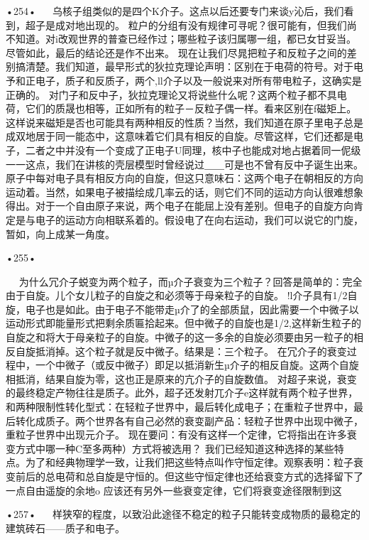 •254•
  
乌核子组类似的是四个K介子。这点以后还要专门来谈y沁后，我们看到，超子是成对地出现的。
粒户的分组有没有规律可寻呢？很可能有，但我们尚不知道。对i改观世界的普查已经作过；哪些粒子该归属哪一组，都已女甘妥当。尽管如此，最后的结论还是作不出来。
现在让我们尽晁把粒子和反粒子之间的差别搞清楚。我们知道，最早形式的狄拉克理论声明：区别在于电荷的符号。对于电予和正电子，质子和反质子，两个,ll介子以及一般说来对所有带电粒子，这确实是正确的。
对门子和反中子，狄拉克理论又将说些什么呢？这两个粒子都不具电荷，它们的质晟也相等，正如所有的粒子－反粒子偶一样。看来区别在f磁矩上。
这样说来磁矩是否也可能具有两种相反的性质？当然，我们知道在原子里电子总是成双地居于同一能态中，这意味着它们具有相反的自旋。尽管这样，它们还都是电子，二者之中并没有一个变成了正电子U同理，核中子也能成对地占据着同一伲级一一这点，我们在讲核的壳层模型时曾经说过＿＿可是也不曾有反中子诞生出来。
原子中每对电子具有相反方向的自旋，但这只意味石：这两个电子在朝相反的方向运动着。当然，如果电子被描绘成几率云的话，则它们不同的运动方向认很难想象得出。对于一个自由原子来说，两个电子在能屈上没有差别。但电子的自旋方向肯定是与电子的运动方向相联系着的。假设电了在向右运动，我们可以说它的门旋，暂如，向上成某一角度。

•255•
  








  
为什么冗介子蜕变为两个粒子，而µ介子衰变为三个粒子？回答是简单的：完全由于自旋。儿个女儿粒子的自旋之和必须等于母亲粒子的自旋。
!l介子具有1/2自旋，电子也是如此。由于电子不能带走µ介了的全部质鼠，因此需要一个中微子以运动形式即能量形式把剩余质匾拾起来。但中微子的自旋也是1/2,这样新生粒子的自旋之和将大于母亲粒子的自旋。中微子的这一多余的自旋必须要由另一粒子的相反自旋抵消掉。这个粒子就是反中微子。结果是：三个粒子。
在冗介子的衰变过程中，一个中微子（或反中微子）即足以抵消新生µ介子的相反自旋。这两个自旋相抵消，结果自旋为零，这也正是原来的亢介子的自旋数值。
对超子来说，衰变的最终稳定产物往往是质子。此外，超子还发射兀介子e这样就有两个粒子世界，和两种限制性转化型式：在轻粒子世界中，最后转化成电子；在重粒子世界中，最后转化成质子。两个世界各有自己必然的衰变副产品：轻粒子世界中出现中微子，重粒子世界中出现元介子。
现在要问：有没有这样一个定律，它将指出在许多衰变方式中哪一种C至多两种）方式将被选用？
我们已经知道这种选择的某些特点。为了和经典物理学一致，让我们把这些特点叫作守恒定律。观察表明：粒子衰变前后的总电荷和总自旋是守恒的。但这些守恒定律也还给衰变方式的选择留下了一点自由遥旋的余地o
应该还有另外一些衰变定律，它们将衰变途径限制到这

•257•
  
样狭窄的程度，以致沿此途径不稳定的粒子只能转变成物质的最稳定的建筑砖石——质子和电子。

